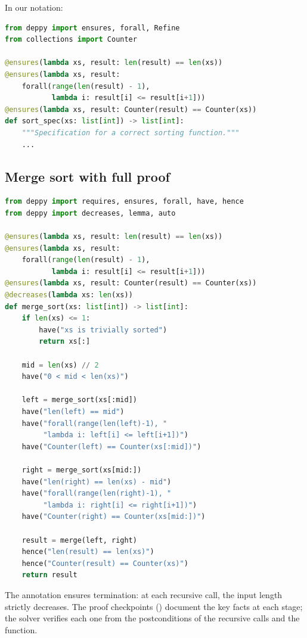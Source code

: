 \documentclass[11pt]{report}
\DeclareRobustCommand{\py}[1]{\texttt{\detokenize{#1}}}
\theoremstyle{definition}
\theoremstyle{plain}
\begin{document}
In our notation:
\begin{lstlisting}[style=deppy,language=Python]
from deppy import ensures, forall, Refine
from collections import Counter

@ensures(lambda xs, result: len(result) == len(xs))
@ensures(lambda xs, result:
    forall(range(len(result) - 1),
           lambda i: result[i] <= result[i+1]))
@ensures(lambda xs, result: Counter(result) == Counter(xs))
def sort_spec(xs: list[int]) -> list[int]:
    """Specification for a correct sorting function."""
    ...
\end{lstlisting}

\subsection{Merge sort with full proof}

\begin{lstlisting}[style=deppy,language=Python]
from deppy import requires, ensures, forall, have, hence
from deppy import decreases, lemma, auto

@ensures(lambda xs, result: len(result) == len(xs))
@ensures(lambda xs, result:
    forall(range(len(result) - 1),
           lambda i: result[i] <= result[i+1]))
@ensures(lambda xs, result: Counter(result) == Counter(xs))
@decreases(lambda xs: len(xs))
def merge_sort(xs: list[int]) -> list[int]:
    if len(xs) <= 1:
        have("xs is trivially sorted")
        return xs[:]

    mid = len(xs) // 2
    have("0 < mid < len(xs)")

    left = merge_sort(xs[:mid])
    have("len(left) == mid")
    have("forall(range(len(left)-1), "
         "lambda i: left[i] <= left[i+1])")
    have("Counter(left) == Counter(xs[:mid])")

    right = merge_sort(xs[mid:])
    have("len(right) == len(xs) - mid")
    have("forall(range(len(right)-1), "
         "lambda i: right[i] <= right[i+1])")
    have("Counter(right) == Counter(xs[mid:])")

    result = merge(left, right)
    hence("len(result) == len(xs)")
    hence("Counter(result) == Counter(xs)")
    return result
\end{lstlisting}

The \py{@decreases(lambda xs: len(xs))} annotation ensures termination: at
each recursive call, the input length strictly decreases. The proof
checkpoints (\py{have}) document the key facts at each stage; the solver
verifies each one from the postconditions of the recursive calls and the
\py{merge} function.
\end{document}

